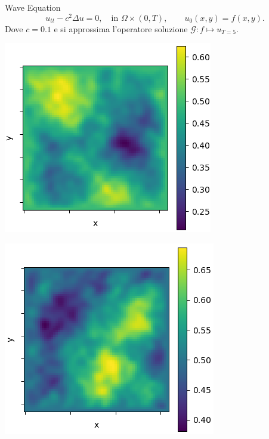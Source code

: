 \documentclass[aspectratio=169]{beamer}
\begin{document}
\begin{frame}[t]{Wave Equation}
    \[
    u_{tt} -c^{2}\Delta u = 0, \quad \text{in } \Omega \times (0, T), \quad\quad u_{0}(x, y) = f(x, y).
    \]
    Dove $c = 0.1$ e si approssima l'operatore soluzione $\mathcal{G}: f\mapsto u_{T=5}$.
    \begin{center}
        \begin{minipage}{0.24\textwidth}
            \includegraphics[width=\textwidth]{operators/wave/input.png}
        \end{minipage}
        \hfill
        \begin{minipage}{0.24\textwidth}
            \includegraphics[width=\textwidth]{operators/wave/output.png}

\end{minipage}
\end{center}
\end{frame}
\end{document}
